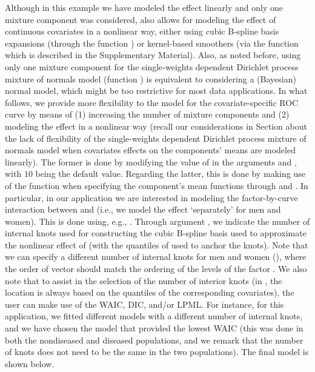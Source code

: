 Although in this example we have modeled the  effect linearly and only one mixture component was considered,  also allows for modeling the effect of continuous covariates in a nonlinear way, either using cubic B-spline basis expansions (through the function ) or  kernel-based smoothers (via the function  which is described in the Supplementary Material). Also, as noted before, using only one mixture component for the single-weights dependent Dirichlet process mixture of normals model (function ) is equivalent to considering a (Bayesian) normal model, which might be too restrictive for most data applications. In what follows, we provide more flexibility to the model for the covariate-specific ROC curve by means of (1) increasing the number of mixture components and (2) modeling the  effect in a nonlinear way (recall our considerations in Section  about the lack of flexibility of the single-weights dependent Dirichlet process mixture of normals model when covariates effects on the components' means are modeled linearly). The former is done by modifying the value of  in the arguments  and , with $10$ being the default value. Regarding the latter, this is done by making use of the function  when specifying the component's mean functions through  and . In particular, in our application we are interested in modeling the factor-by-curve interaction between  and  (i.e., we model the  effect `separately' for men and women). This is done using, e.g., . Through argument , we indicate the number of internal knots used for constructing the cubic B-spline basis used to approximate the nonlinear effect of  (with the quantiles of  used to anchor the knots). Note that we can specify a different number of internal knots for men and women (), where the order of vector  should match the ordering of the levels of the factor . We also note that to assist in the selection of the number of interior knots (in , the location is always based on the quantiles of the corresponding covariates), the user can make use of the WAIC, DIC, and/or LPML. For instance, for this application, we fitted different models with a different number of internal knots, and we have chosen the model that provided the lowest WAIC (this was done in both the nondiseased and diseased populations, and we remark that the number of knots does not need to be the same in the two populations). The final model is shown below.

